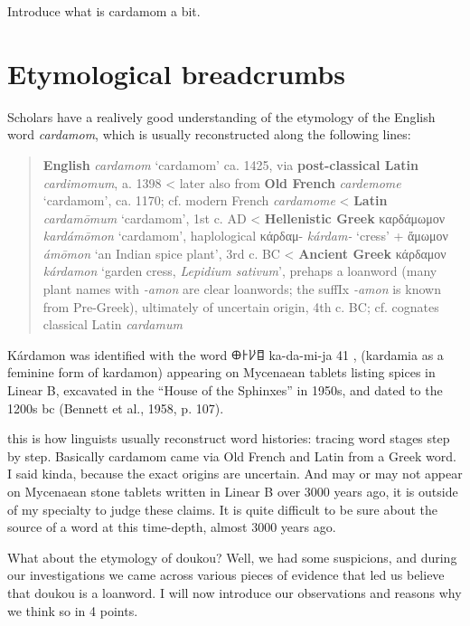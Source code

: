 \documentclass[12pt]{article}
\begin{document}
Introduce what is cardamom a bit.

\section{Etymological breadcrumbs}

Scholars have a realively good understanding of the etymology of the English word \textit{cardamom}, which is usually reconstructed along the following lines:

\begin{quote}
    \textbf{English} \textit{cardamom} `cardamom' ca. 1425, via \textbf{post-classical Latin} \textit{cardimomum}, a. 1398
    < later also from \textbf{Old French} \textit{cardemome} `cardamom', ca. 1170; cf. modern French \textit{cardamome}
    < \textbf{Latin} \textit{cardamōmum} `cardamom', 1st c. AD
    < \textbf{Hellenistic Greek} {καρδάμωμον} \textit{kardámōmon} `cardamom', haplological κάρδαμ- \textit{kárdam-} `cress' + ἄμωμον \textit{ámōmon} `an Indian spice plant', 3rd c. BC
    < \textbf{Ancient Greek} {κάρδαμον} \textit{kárdamon} `garden cress, \textit{Lepidium sativum}', prehaps a loanword (many plant names with \textit{-amon} are clear loanwords; the suffIx \textit{-amon} is known from Pre-Greek), ultimately of uncertain origin, 4th c. BC; cf. cognates classical Latin \textit{cardamum}
    \parencites[s.v. cardamom]{oed}[s.v. cardamome]{tlfi}[s.v. cardamomum]{lewis_1879_latin}[s.v. καρδάμωμον]{liddell_1940_greekenglish}[s.v. κάρδαμον]{liddell_1940_greekenglish}[644]{beekes_2010_etymological}
\end{quote}

Kárdamon was identified with the word 𐀏𐀅𐀖𐀊 ka-da-mi-ja 41 , (kardamia as a feminine form of kardamon) appearing on Mycenaean tablets listing spices in Linear B, excavated in the “House of the Sphinxes” in 1950s, and dated to the 1200s bc (Bennett et al., 1958, p. 107).



this is how linguists usually reconstruct word histories: tracing word stages step by step. Basically cardamom came via Old French and Latin from a Greek word. I said kinda, because the exact origins are uncertain. And may or may not appear on Mycenaean stone tablets written in Linear B over 3000 years ago, it is outside of my specialty to judge these claims. It is quite difficult to be sure about the source of a word at this time-depth, almost 3000 years ago.

What about the etymology of doukou? Well, we had some suspicions, and during our investigations we came across various pieces of evidence that led us believe that doukou is a loanword. I will now introduce our observations and reasons why we think so in 4 points.
\end{document}
